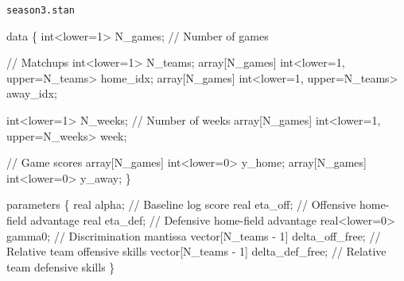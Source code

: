 \documentclass[
  letterpaper,
  DIV=11,
  numbers=noendperiod]{scrartcl}
\newenvironment{Shaded}{\begin{snugshade}}{\end{snugshade}}
\newcommand{\CommentTok}[1]{\textcolor[rgb]{0.37,0.37,0.37}{#1}}
\newcommand{\DataTypeTok}[1]{\textcolor[rgb]{0.68,0.00,0.00}{#1}}
\newcommand{\DecValTok}[1]{\textcolor[rgb]{0.68,0.00,0.00}{#1}}
\newcommand{\KeywordTok}[1]{\textcolor[rgb]{0.00,0.23,0.31}{#1}}
\newcommand{\NormalTok}[1]{\textcolor[rgb]{0.00,0.23,0.31}{#1}}
\begin{document}
\begin{codelisting}

\caption{\texttt{season3.stan}}

\begin{Shaded}
\begin{Highlighting}[]
\KeywordTok{data}\NormalTok{ \{}
  \DataTypeTok{int}\NormalTok{\textless{}}\KeywordTok{lower}\NormalTok{=}\DecValTok{1}\NormalTok{\textgreater{} N\_games; }\CommentTok{// Number of games}

  \CommentTok{// Matchups}
  \DataTypeTok{int}\NormalTok{\textless{}}\KeywordTok{lower}\NormalTok{=}\DecValTok{1}\NormalTok{\textgreater{} N\_teams;}
  \DataTypeTok{array}\NormalTok{[N\_games] }\DataTypeTok{int}\NormalTok{\textless{}}\KeywordTok{lower}\NormalTok{=}\DecValTok{1}\NormalTok{, }\KeywordTok{upper}\NormalTok{=N\_teams\textgreater{} home\_idx;}
  \DataTypeTok{array}\NormalTok{[N\_games] }\DataTypeTok{int}\NormalTok{\textless{}}\KeywordTok{lower}\NormalTok{=}\DecValTok{1}\NormalTok{, }\KeywordTok{upper}\NormalTok{=N\_teams\textgreater{} away\_idx;}

  \DataTypeTok{int}\NormalTok{\textless{}}\KeywordTok{lower}\NormalTok{=}\DecValTok{1}\NormalTok{\textgreater{} N\_weeks; }\CommentTok{// Number of weeks}
  \DataTypeTok{array}\NormalTok{[N\_games] }\DataTypeTok{int}\NormalTok{\textless{}}\KeywordTok{lower}\NormalTok{=}\DecValTok{1}\NormalTok{, }\KeywordTok{upper}\NormalTok{=N\_weeks\textgreater{} week;}

  \CommentTok{// Game scores}
  \DataTypeTok{array}\NormalTok{[N\_games] }\DataTypeTok{int}\NormalTok{\textless{}}\KeywordTok{lower}\NormalTok{=}\DecValTok{0}\NormalTok{\textgreater{} y\_home;}
  \DataTypeTok{array}\NormalTok{[N\_games] }\DataTypeTok{int}\NormalTok{\textless{}}\KeywordTok{lower}\NormalTok{=}\DecValTok{0}\NormalTok{\textgreater{} y\_away;}
\NormalTok{\}}

\KeywordTok{parameters}\NormalTok{ \{}
  \DataTypeTok{real}\NormalTok{ alpha;                         }\CommentTok{// Baseline log score}
  \DataTypeTok{real}\NormalTok{ eta\_off;                       }\CommentTok{// Offensive home{-}field advantage}
  \DataTypeTok{real}\NormalTok{ eta\_def;                       }\CommentTok{// Defensive home{-}field advantage}
  \DataTypeTok{real}\NormalTok{\textless{}}\KeywordTok{lower}\NormalTok{=}\DecValTok{0}\NormalTok{\textgreater{} gamma0;               }\CommentTok{// Discrimination mantissa}
  \DataTypeTok{vector}\NormalTok{[N\_teams {-} }\DecValTok{1}\NormalTok{] delta\_off\_free; }\CommentTok{// Relative team offensive skills}
  \DataTypeTok{vector}\NormalTok{[N\_teams {-} }\DecValTok{1}\NormalTok{] delta\_def\_free; }\CommentTok{// Relative team defensive skills}
\NormalTok{\}}


\end{Highlighting}
\end{Shaded}
\end{codelisting}
\end{document}
